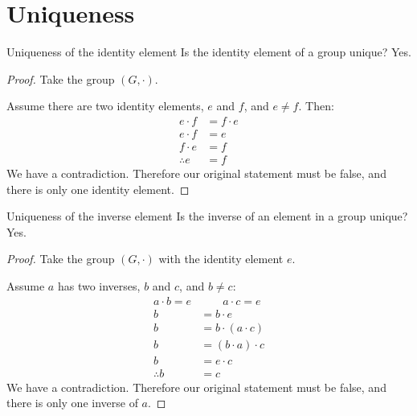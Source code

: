 \section{Uniqueness}
\begin{namedframe}{Uniqueness of the identity element}
	Is the identity element of a group unique? \pause Yes.
	\begin{proof}
		Take the group $(G, \cdot)$.

		Assume there are two identity elements, $e$ and $f$, and $e \neq f$. Then:
		\begin{align*}
			e \cdot f &= f \cdot e\\
			e \cdot f &= e\\
			f \cdot e &= f\\
			\therefore e &= f
		\end{align*}
		We have a contradiction. Therefore our original statement must be false, and there is only one identity element.
	\end{proof}
\end{namedframe}
\begin{namedframe}{Uniqueness of the inverse element}
	Is the inverse of an element in a group unique? \pause Yes.
	\begin{proof}
		Take the group $(G, \cdot)$ with the identity element $e$.

		Assume $a$ has two inverses, $b$ and $c$, and $b \neq c$:
		\vspace{-2ex}
		\begin{align*}
			a \cdot b = e &\qquad a \cdot c = e\\
			b &= b \cdot e\\
			b &= b \cdot (a \cdot c)\\
			b &= (b \cdot a) \cdot c\\
			b &= e \cdot c\\
			\therefore b &= c
		\end{align*}
		We have a contradiction. Therefore our original statement must be false, and there is only one inverse of $a$.
	\end{proof}
\end{namedframe}
